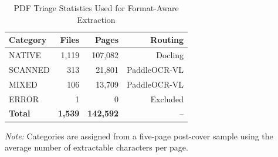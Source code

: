 \begin{table}[t]
\centering
\caption{PDF Triage Statistics Used for Format-Aware Extraction}
\label{tab:pdf_triage_statistics}
\scriptsize
\setlength{\tabcolsep}{4pt}
\renewcommand{\arraystretch}{1.08}
\begin{tabularx}{\columnwidth}{@{}l r r r@{}}
\hline
\textbf{Category} & \textbf{Files} & \textbf{Pages} & \textbf{Routing} \\
\hline
NATIVE & 1,119 & 107,082 & Docling \\
SCANNED & 313 & 21,801 & PaddleOCR-VL \\
MIXED & 106 & 13,709 & PaddleOCR-VL \\
ERROR & 1 & 0 & Excluded \\
\hline
\textbf{Total} & \textbf{1,539} & \textbf{142,592} & -- \\
\hline
\end{tabularx}
\vbox{\vspace{1ex}\small \textit{Note:} Categories are assigned from a five-page post-cover sample using the average number of extractable characters per page.}
\end{table}

